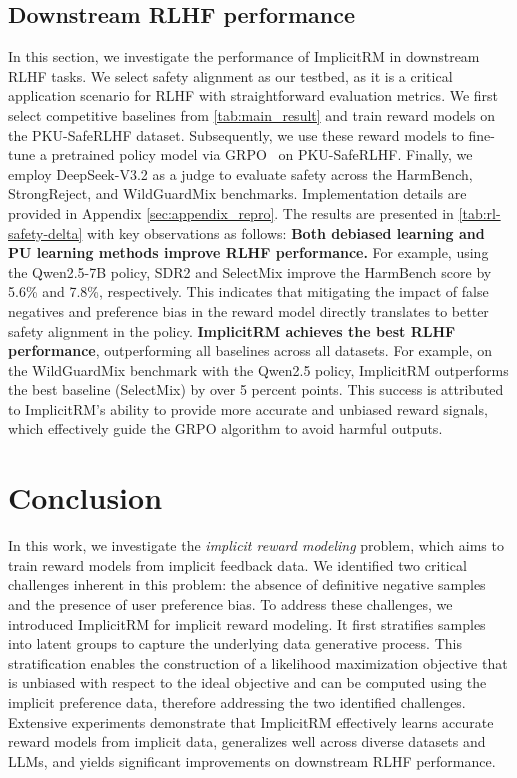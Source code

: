 \documentclass[]{arxiv_singlecolumn}
\theoremstyle{plain}
\theoremstyle{definition}
\theoremstyle{remark}
\begin{document}
\subsection{Downstream RLHF performance}
\label{sec:downstream}

In this section, we investigate the performance of ImplicitRM in downstream RLHF tasks. We select safety alignment as our testbed, as it is a critical application scenario for RLHF with straightforward evaluation metrics. We first select competitive baselines from \autoref{tab:main_result} and train reward models on the PKU-SafeRLHF dataset. Subsequently, we use these reward models to fine-tune a pretrained policy model via GRPO~\citep{guo2025deepseek} on PKU-SafeRLHF. Finally, we employ DeepSeek-V3.2 as a judge to evaluate safety across the HarmBench\citep{HarmBench}, StrongReject, and WildGuardMix benchmarks. Implementation details are provided in Appendix \ref{sec:appendix_repro}. The results are presented in \autoref{tab:rl-safety-delta} with key observations as follows:
 \textbf{Both debiased learning and PU learning methods improve RLHF performance.} For example, using the Qwen2.5-7B policy, SDR2 and SelectMix improve the HarmBench score by 5.6\% and 7.8\%, respectively.  This indicates that mitigating the impact of false negatives and preference bias in the reward model directly translates to better safety alignment in the policy.
 \textbf{ImplicitRM achieves the best RLHF performance}, outperforming all baselines across all datasets. For example, on the WildGuardMix benchmark with the Qwen2.5 policy, ImplicitRM outperforms the best baseline (SelectMix) by over 5 percent points. This success is attributed to ImplicitRM's ability to provide more accurate and unbiased reward signals, which effectively guide the GRPO algorithm to avoid harmful outputs.

\section{Conclusion}
\label{sec:conclusion}
In this work, we investigate the \textit{implicit reward modeling} problem, which aims to train reward models from implicit feedback data. We identified two critical challenges inherent in this problem: the absence of definitive negative samples and the presence of user preference bias.
To address these challenges, we introduced ImplicitRM for implicit reward modeling. It first stratifies samples into latent groups to capture the underlying data generative process. This stratification enables the construction of a likelihood maximization objective that is unbiased with respect to the ideal objective and can be computed using the implicit preference data, therefore addressing the two identified challenges.  Extensive experiments demonstrate that ImplicitRM effectively learns accurate reward models from implicit data, generalizes well across diverse datasets and LLMs, and yields significant improvements on downstream RLHF performance.
\end{document}
